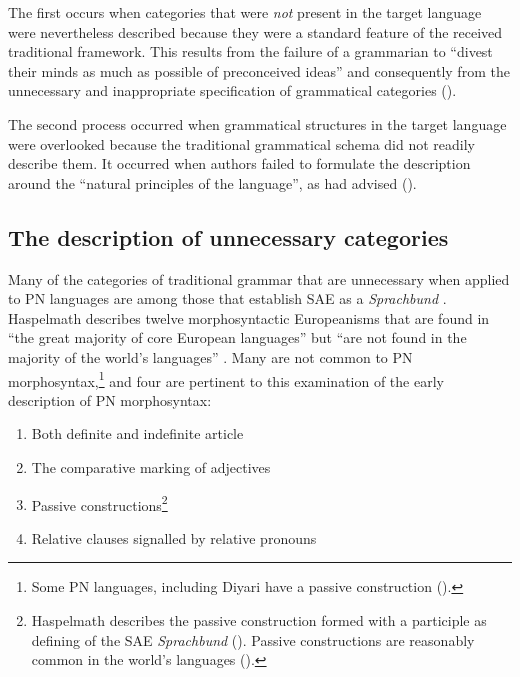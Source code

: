 The first occurs when categories that were \textit{not} present in the target language were nevertheless described because they were a standard feature of the received traditional framework. This results from the failure of a grammarian to “divest their minds as much as possible of preconceived ideas” \citep[vi]{schurmann_vocabulary_1844} and consequently from the unnecessary and inappropriate specification of grammatical categories ().

The second process occurred when grammatical structures in the target language were overlooked because the traditional grammatical schema did not readily describe them. It occurred when authors failed to formulate the description around the “natural principles of the language'', as \citet[x]{threlkeld_australian_1834} had advised ().

\subsection{The description of unnecessary categories}
\label{sec:key:2.3.1}

Many of the categories of traditional grammar that are unnecessary when applied to PN languages are among those that establish SAE as a \textit{Sprachbund} \citep{haspelmath_european_2001}. Haspelmath describes twelve morphosyntactic Europeanisms that are found in “the great majority of core European languages” but “are not found in the majority of the world’s languages” \citep[1493]{haspelmath_european_2001}. Many are not common to PN morphosyntax,\footnote{Some PN languages, including Diyari have a passive construction (\citealt[530]{dixon_australian_2002}). }  and four are pertinent to this examination of the early description of PN morphosyntax:

\begin{enumerate}
    \item Both definite and indefinite article
    \item The comparative marking of adjectives
    \item Passive constructions\footnote{Haspelmath describes the passive construction formed with a participle as defining of the SAE \textit{Sprachbund} (\citeyear[1496--1497]{haspelmath_european_2001}). Passive constructions are reasonably common in the world’s languages (\citealt{siewierska_passive_2013}).}
    \item Relative clauses signalled by relative pronouns
\end{enumerate}

